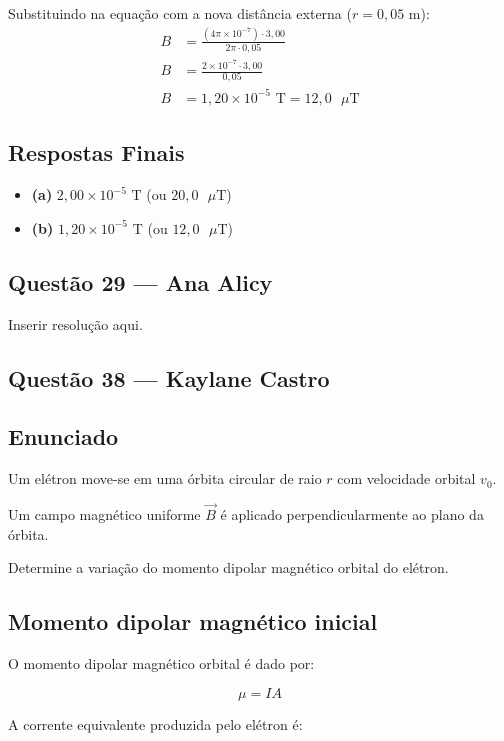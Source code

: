 \documentclass[12pt,a4paper]{article}
\begin{document}
Substituindo na equação com a nova distância externa ($r = 0,05\text{ m}$):
\begin{align*}
B &= \frac{(4\pi \times 10^{-7}) \cdot 3,00}{2\pi \cdot 0,05} \\
B &= \frac{2 \times 10^{-7} \cdot 3,00}{0,05} \\
B &= 1,20 \times 10^{-5}\text{ T} = 12,0\text{ }\mu\text{T}
\end{align*}

\subsection*{Respostas Finais}
\begin{itemize}
    \item \textbf{(a)} $2,00 \times 10^{-5}\text{ T}$ \quad (ou $20,0\text{ }\mu\text{T}$)
    \item \textbf{(b)} $1,20 \times 10^{-5}\text{ T}$ \quad (ou $12,0\text{ }\mu\text{T}$)
\end{itemize}

\subsection{Questão 29 — Ana Alicy}
Inserir resolução aqui.

\subsection{Questão 38 — Kaylane Castro}
\subsection*{Enunciado}

Um elétron move-se em uma órbita circular de raio $r$ com
velocidade orbital $v_0$.

Um campo magnético uniforme $\vec{B}$ é aplicado perpendicularmente
ao plano da órbita.

Determine a variação do momento dipolar magnético orbital do elétron.


\subsection*{Momento dipolar magnético inicial}

O momento dipolar magnético orbital é dado por:

\[
\mu = IA
\]

A corrente equivalente produzida pelo elétron é:
\end{document}
